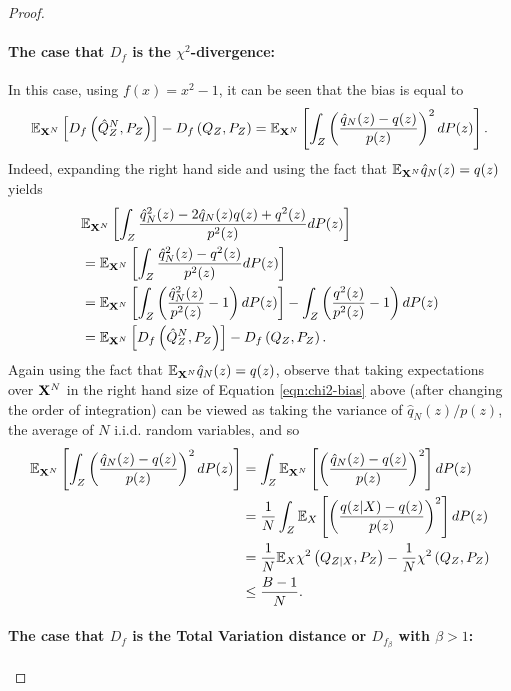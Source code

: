 \begin{proof}
\paragraph{The case that $D_f$ is the $\chi^2$-divergence:}
% 
In this case, using $f(x) = x^2-1$, it can be seen that the bias is equal to
\begin{align}\label{eqn:chi2-bias}
    \mathbb{E}_{\mathbf{X}^N} \left[ D_{f}\left( \hat{Q}_Z^N , P_Z\right)\right] - D_{f}\left( Q_{Z} , P_Z\right) = \mathbb{E}_{\mathbf{X}^N}\left[ \int_Z  \left(\frac{\hat{q}_N(z) - q(z)}{p(z)}\right)^2 dP(z) \right].
\end{align}
Indeed, expanding the right hand side and using the fact that $\mathbb{E}_{\mathbf{X}^N}\hat{q}_N(z) = q(z)$ yields
\begin{align*}
    &\mathbb{E}_{\mathbf{X}^N}\left[ \int_Z  \frac{\hat{q}^2_N(z) - 2\hat{q}_N(z)q(z) + q^2(z)}{p^2(z)} dP(z) \right]\\
    &=\mathbb{E}_{\mathbf{X}^N}\left[ \int_Z  \frac{\hat{q}^2_N(z) - q^2(z)}{p^2(z)} dP(z) \right]\\
    &=\mathbb{E}_{\mathbf{X}^N}\left[ \int_Z  \left(\frac{\hat{q}^2_N(z)}{p^2(z)} - 1 \right)dP(z) \right] - \int_Z  \left(\frac{q^2(z)}{p^2(z)} - 1\right) dP(z)\\
    &= \mathbb{E}_{\mathbf{X}^N} \left[ D_{f}\left( \hat{Q}_Z^N , P_Z\right)\right] - D_{f}\left( Q_{Z} , P_Z\right).
\end{align*}
Again using the fact that $\mathbb{E}_{\mathbf{X}^N}\hat{q}_N(z) = q(z)$, observe that taking expectations over $\mathbf{X}^N$ in the right hand size of Equation \ref{eqn:chi2-bias} above (after changing the order of integration) can be viewed as taking the variance of $\hat{q}_N(z)/p(z)$, the average of $N$ i.i.d. random variables, and so
\begin{align*}
 \mathbb{E}_{\mathbf{X}^N}\left[ \int_Z  \left(\frac{\hat{q}_N(z) - q(z)}{p(z)}\right)^2 dP(z) \right] &= \int_Z \mathbb{E}_{\mathbf{X}^N}\left[  \left(\frac{\hat{q}_N(z) - q(z)}{p(z)}\right)^2 \right] dP(z) \\
 &=\frac{1}{N} \int_Z \mathbb{E}_{X}\left[  \left(\frac{q(z|X) - q(z)}{p(z)}\right)^2 \right] dP(z) \\
 &= \frac{1}{N} \mathbb{E}_{X} \chi^2\left( Q_{Z|X} , P_Z \right) - \frac{1}{N} \chi^2\left( Q_{Z} , P_Z \right)\\
 &\leq \frac{B-1}{N}.
\end{align*}

\paragraph{The case that $D_f$ is the Total Variation distance or $D_{f_\beta}$ with $\beta>1$:}


\end{proof}
